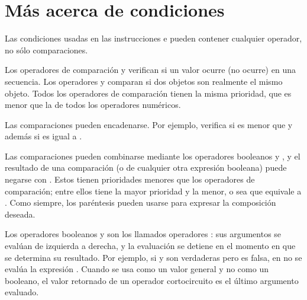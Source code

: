 \documentclass[a4,10pt,spanish]{sphinxmanual}
\begin{document}
\section{Más acerca de condiciones}
\label{\detokenize{tutorial/datastructures:more-on-conditions}}\label{\detokenize{tutorial/datastructures:tut-conditions}}
\sphinxAtStartPar
Las condiciones usadas en las instrucciones  e  pueden contener cualquier operador, no sólo comparaciones.

\sphinxAtStartPar
Los operadores de comparación  y  verifican si un valor ocurre (no ocurre) en una secuencia. Los operadores  y  comparan si dos objetos son realmente el mismo objeto. Todos los operadores de comparación tienen la misma prioridad, que es menor que la de todos los operadores numéricos.

\sphinxAtStartPar
Las comparaciones pueden encadenarse.  Por ejemplo,  verifica si  es menor que  y además si  es igual a .

\sphinxAtStartPar
Las comparaciones pueden combinarse mediante los operadores booleanos  y , y el resultado de una comparación (o de cualquier otra expresión booleana) puede negarse con .  Estos tienen prioridades menores que los operadores de comparación; entre ellos  tiene la mayor prioridad y  la menor, o sea que  equivale a .  Como siempre, los paréntesis pueden usarse para expresar la composición deseada.

\sphinxAtStartPar
Los operadores booleanos  y  son los llamados operadores : sus argumentos se evalúan de izquierda a derecha, y la evaluación se detiene en el momento en que se determina su resultado.  Por ejemplo, si  y  son verdaderas pero  es falsa, en  no se evalúa la expresión .  Cuando se usa como un valor general y no como un booleano, el valor retornado de un operador cortocircuito es el último argumento evaluado.
\end{document}
